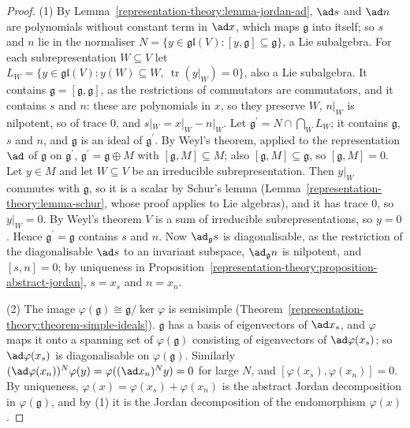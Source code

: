 \begin{proof}
(1) By Lemma~\ref{representation-theory:lemma-jordan-ad}, $\ad s$ and $\ad n$ are polynomials without constant term in $\ad x$, which maps $\mathfrak{g}$ into itself; so $s$ and
$n$ lie in the normaliser $N = \{y \in \mathfrak{gl}(V) : [y, \mathfrak{g}] \subseteq \mathfrak{g}\}$, a Lie subalgebra. For each subrepresentation $W \subseteq V$ let
$L_W = \{y \in \mathfrak{gl}(V) : y(W) \subseteq W,\ \operatorname{tr}(y|_W) = 0\}$, also a Lie subalgebra. It contains $\mathfrak{g} = [\mathfrak{g}, \mathfrak{g}]$, as the
restrictions of commutators are commutators, and it contains $s$ and $n$: these are polynomials in $x$, so they preserve $W$, $n|_W$ is nilpotent, so of trace $0$, and
$s|_W = x|_W - n|_W$. Let $\mathfrak{g}^{\prime} = N \cap \bigcap_WL_W$; it contains $\mathfrak{g}$, $s$ and $n$, and $\mathfrak{g}$ is an ideal of $\mathfrak{g}^{\prime}$. By Weyl's
theorem, applied to the representation $\ad$ of $\mathfrak{g}$ on $\mathfrak{g}^{\prime}$, $\mathfrak{g}^{\prime} = \mathfrak{g} \oplus M$ with $[\mathfrak{g}, M] \subseteq M$;
also $[\mathfrak{g}, M] \subseteq \mathfrak{g}$, so $[\mathfrak{g}, M] = 0$. Let $y \in M$ and let $W \subseteq V$ be an irreducible subrepresentation. Then $y|_W$ commutes with
$\mathfrak{g}$, so it is a scalar by Schur's lemma (Lemma~\ref{representation-theory:lemma-schur}, whose proof applies to Lie algebras), and it has trace $0$, so $y|_W = 0$. By
Weyl's theorem $V$ is a sum of irreducible subrepresentations, so $y = 0$. Hence $\mathfrak{g}^{\prime} = \mathfrak{g}$ contains $s$ and $n$. Now $\ad_{\mathfrak{g}}s$ is
diagonalisable, as the restriction of the diagonalisable $\ad s$ to an invariant subspace, $\ad_{\mathfrak{g}}n$ is nilpotent, and $[s, n] = 0$; by uniqueness in
Proposition~\ref{representation-theory:proposition-abstract-jordan}, $s = x_s$ and $n = x_n$.

(2) The image $\varphi(\mathfrak{g}) \cong \mathfrak{g}/\ker\varphi$ is semisimple (Theorem~\ref{representation-theory:theorem-simple-ideals}). $\mathfrak{g}$ has a basis of eigenvectors of
$\ad x_s$, and $\varphi$ maps it onto a spanning set of $\varphi(\mathfrak{g})$ consisting of eigenvectors of $\ad\varphi(x_s)$; so $\ad\varphi(x_s)$ is diagonalisable on
$\varphi(\mathfrak{g})$. Similarly $(\ad\varphi(x_n))^N\varphi(y) = \varphi((\ad x_n)^Ny) = 0$ for large $N$, and $[\varphi(x_s), \varphi(x_n)] = 0$. By uniqueness,
$\varphi(x) = \varphi(x_s) + \varphi(x_n)$ is the abstract Jordan decomposition in $\varphi(\mathfrak{g})$, and by (1) it is the Jordan decomposition of the endomorphism $\varphi(x)$.
\end{proof}


